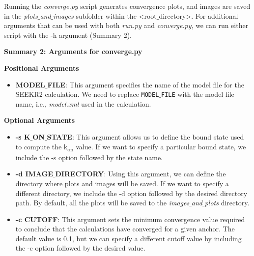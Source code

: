 \documentclass[9pt,training,pubversion]{livecoms}
\begin{document}
\noindent Running the \textit{converge.py} script generates convergence plots, and images are saved in the \textit{plots$\_$and$\_$images} subfolder within the <root$\_$directory>. For additional arguments that can be used with both \textit{run.py} and \textit{converge.py}, we can run either script with the -h argument (Summary 2). 


\begin{tcolorbox}[colback=black!8!white, colframe=black!50!black, fontlower=\tiny, left=0pt, right=10pt, top=2pt, bottom=2pt]
\textbf{Summary 2: Arguments for converge.py}

\vspace{2mm}

\noindent \textbf{Positional Arguments} \par

\begin{itemize}

\item \textbf{MODEL$\_$FILE}: This argument specifies the name of the model file for the SEEKR2 calculation. We need to replace \texttt{MODEL$\_$FILE} with the model file name, i.e., \textit{model.xml} used in the calculation.

\end{itemize}

\vspace{2mm}

\noindent \textbf{Optional Arguments} \par

\begin{itemize}

\item \textbf{-s K$\_$ON$\_$STATE}: This argument allows us to define the bound state used to compute the k\textsubscript{on} value. If we want to specify a particular bound state, we include the -s option followed by the state name.

\item \textbf{-d IMAGE$\_$DIRECTORY}: Using this argument, we can define the directory where plots and images will be saved. If we want to specify a different directory, we include the -d option followed by the desired directory path. By default, all the plots will be saved to the \textit{images$\_$and$\_$plots} directory. 

\item \textbf{-c CUTOFF}: This argument sets the minimum convergence value required to conclude that the calculations have converged for a given anchor. The default value is 0.1, but we can specify a different cutoff value by including the -c option followed by the desired value.


\end{itemize}
\end{tcolorbox}
\end{document}
